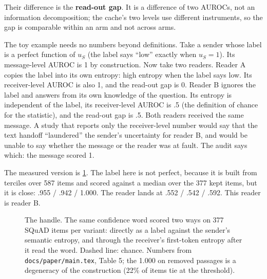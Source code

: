 \documentclass[11pt,a4paper]{report}
\begin{document}
Their difference is the \textbf{read-out gap}. It is a difference of two AUROCs, not an information decomposition; the cache's two levels use different instruments, so the gap is comparable within an arm and not across arms.

The toy example needs no numbers beyond definitions. Take a sender whose label is a perfect function of $u_S$ (the label says ``low'' exactly when $u_S = 1$). Its message-level AUROC is 1 by construction. Now take two readers. Reader A copies the label into its own entropy: high entropy when the label says low. Its receiver-level AUROC is also 1, and the read-out gap is 0. Reader B ignores the label and answers from its own knowledge of the question. Its entropy is independent of the label, its receiver-level AUROC is .5 (the definition of chance for the statistic), and the read-out gap is .5. Both readers received the same message. A study that reports only the receiver-level number would say that the text handoff ``laundered'' the sender's uncertainty for reader B, and would be unable to say whether the message or the reader was at fault. The audit says which: the message scored 1.

The measured version is \cref{fig:handle}. The label here is not perfect, because it is built from terciles over 587 items and scored against a median over the 377 kept items, but it is close: .955 / .942 / 1.000. The reader lands at .552 / .542 / .592. This reader is reader B.

\begin{figure}[h]
\centering
{}
\caption{The handle. The same confidence word scored two ways on 377 SQuAD items per variant: directly as a label against the sender's semantic entropy, and through the receiver's first-token entropy after it read the word. Dashed line: chance. Numbers from \texttt{docs/paper/main.tex}, Table 5; the 1.000 on removed passages is a degeneracy of the construction (22\% of items tie at the threshold).}
\label{fig:handle}
\end{figure}
\end{document}
